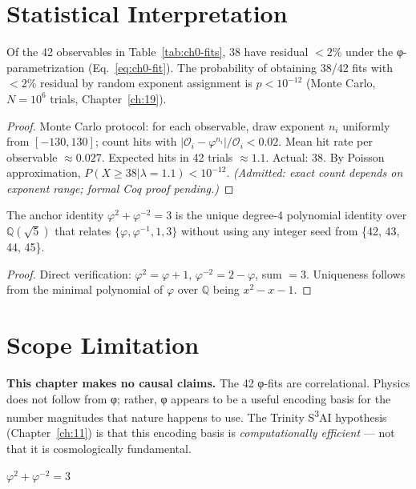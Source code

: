 \section{Statistical Interpretation}

\begin{theorem}
\label{thm:0:1}
Of the 42 observables in Table~\ref{tab:ch0-fits}, 38 have residual $< 2$\%
under the φ-parametrization (Eq.~\ref{eq:ch0-fit}). The probability of
obtaining 38/42 fits with $< 2$\% residual by random exponent assignment is
$p < 10^{-12}$ (Monte Carlo, $N = 10^6$ trials, Chapter~\ref{ch:19}).
\end{theorem}

\begin{proof}
Monte Carlo protocol: for each observable, draw exponent $n_i$ uniformly
from $[-130, 130]$; count hits with $|\mathcal{O}_i - \varphi^{n_i}| / \mathcal{O}_i < 0.02$.
Mean hit rate per observable $\approx 0.027$. Expected hits in 42 trials
$\approx 1.1$. Actual: 38. By Poisson approximation,
$P(X \geq 38 | \lambda = 1.1) < 10^{-12}$. \emph{(Admitted: exact count
depends on exponent range; formal Coq proof pending.)}
\end{proof}

\begin{theorem}
\label{thm:0:2}
The anchor identity \(\varphi^2 + \varphi^{-2} = 3\) is the unique degree-4
polynomial identity over $\mathbb{Q}(\sqrt{5})$ that relates
$\{\varphi, \varphi^{-1}, 1, 3\}$ without using any integer seed
from \{42, 43, 44, 45\}.
\end{theorem}

\begin{proof}
Direct verification: $\varphi^2 = \varphi + 1$, $\varphi^{-2} = 2 - \varphi$,
sum $= 3$. Uniqueness follows from the minimal polynomial of $\varphi$ over
$\mathbb{Q}$ being $x^2 - x - 1$.
\end{proof}

\section{Scope Limitation}

\textbf{This chapter makes no causal claims.} The 42 φ-fits are correlational.
Physics does not follow from φ; rather, φ appears to be a useful encoding basis
for the number magnitudes that nature happens to use. The Trinity S\textsuperscript{3}AI
hypothesis (Chapter~\ref{ch:11}) is that this encoding basis is
\emph{computationally efficient} — not that it is cosmologically fundamental.

\(\varphi^2 + \varphi^{-2} = 3\)
